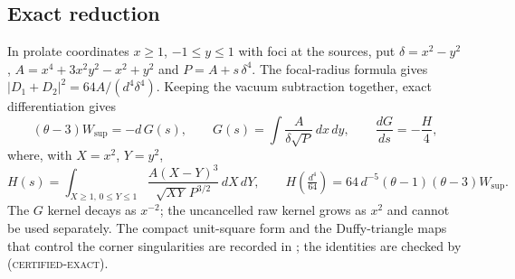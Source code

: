 \documentclass[aps,prd,onecolumn,amsmath,amssymb,longbibliography,floatfix,nofootinbib]{revtex4-2}
\newcommand{\Wsup}{W_{\mathrm{sup}}}
\newcommand{\st}[1]{\textsc{#1}}
\begin{document}
\subsection{Exact reduction}
In prolate coordinates $x\ge1$, $-1\le y\le1$ with foci at the sources, put $\delta=x^2-y^2$, $A=x^4+3x^2y^2-x^2+y^2$ and $P=A+s\,\delta^4$. The focal-radius formula gives $|D_1+D_2|^2=64A/(d^4\delta^4)$. Keeping the vacuum subtraction together, exact differentiation gives
\begin{equation}
(\theta-3)\Wsup=-d\,G(s),\qquad G(s)=\int\frac{A}{\delta\sqrt{P}}\,dx\,dy,\qquad
\frac{dG}{ds}=-\frac{H}{4},
\end{equation}
where, with $X=x^2$, $Y=y^2$,
\begin{equation}
H(s)=\int_{X\ge1,\,0\le Y\le1}\frac{A(X-Y)^3}{\sqrt{XY}\,P^{3/2}}\,dX\,dY,\qquad
H\!\left(\tfrac{d^4}{64}\right)=64\,d^{-5}(\theta-1)(\theta-3)\Wsup .
\label{eq:HW}
\end{equation}
The $G$ kernel decays as $x^{-2}$; the uncancelled raw kernel grows as $x^2$ and cannot be used separately. The compact unit-square form and the Duffy-triangle maps that control the corner singularities are recorded in ; the identities are checked by  (\st{certified-exact}).
\end{document}
